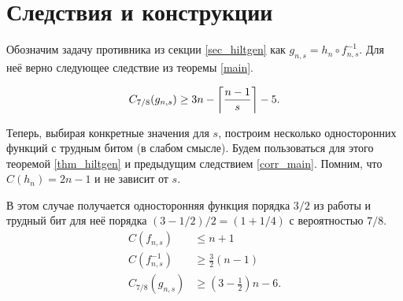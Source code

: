 \documentclass[a4paper, 14pt]{extarticle}
\begin{document}
\section{Следствия и конструкции}
\label{sec_corr}

Обозначим задачу противника из секции \ref{sec_hiltgen} как $g_{n, s} = h_n
\circ f_{n, s}^{-1}$. Для неё верно следующее следствие из теоремы \ref{main}.

\begin{corollary}
\[
C_{7/8}(g_{n, s}) \geq 3n - \ceil*{\frac {n - 1} s} - 5.
\]
\label{corr_main}
\end{corollary}

% 

Теперь, выбирая конкретные значения для $s$, построим несколько односторонних
функций с трудным битом (в слабом смысле). Будем пользоваться для этого теоремой
\ref{thm_hiltgen} и предыдущим следствием \ref{corr_main}. Помним, что $C(h_n) =
2n - 1$ и не зависит от $s$.

\begin{construction}[$s = 2$.]
В этом случае получается односторонняя функция порядка $3/2$ из работы
\cite{hiltgen1993} и трудный бит для неё порядка $(3 - 1/2) / 2 = (1 + 1/4)$ с
вероятностью $7/8$.
\[
\begin{aligned}
C(f_{n, s}) &\leq n + 1 \\
C(f_{n, s}^{-1}) &\geq \frac 3 2 (n - 1) \\
C_{7/8}(g_{n, s}) &\geq (3 - \frac 1 2)n - 6. \\
\end{aligned}
\]
\end{construction}
\end{document}
